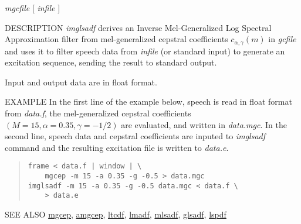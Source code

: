 \begin{synopsis}
\item [imglsadf] [ --m $M$ ] [ --a $A$ ] [ --g $G$ ] [ --p $P$ ]
		 [ --i $I$ ]  [ --t ]  [ --k ]
\item [\ ~~~~~~~~~] {\em mgcfile} [ {\em infile} ]
\end{synopsis}

\begin{qsection}{DESCRIPTION}
{\em imglsadf} derives an Inverse Mel-Generalized 
Log Spectral Approximation filter from 
mel-generalized cepstral coefficients $c_{\alpha,\gamma}(m)$ in {\em gcfile} 
and uses it to filter speech data from {\em infile} (or standard input) 
to generate an excitation sequence,
sending the result to standard output.

Input and output data are in float format.
\end{qsection}

\begin{options} 
\end{options}

\begin{qsection}{EXAMPLE}
In the first line of the example below, 
speech is read in float format from {\em data.f},
the mel-generalized cepstral coefficients $(M=15,\alpha=0.35,\gamma=-1/2)$
are evaluated, and written in {\em data.mgc}.
In the second line,
speech data and cepstral coefficients are
inputed to {\em imglsadf} command and the resulting excitation file
is written to {\em data.e}.
\begin{quote}
 \verb!frame < data.f | window | \!\\
 \verb!    mgcep -m 15 -a 0.35 -g -0.5 > data.mgc!\\
 \verb!imglsadf -m 15 -a 0.35 -g -0.5 data.mgc < data.f \!\\
 \verb!    > data.e!
\end{quote} 
\end{qsection}

\begin{qsection}{SEE ALSO}
\hyperlink{mgcep}{mgcep},
\hyperlink{amgcep}{amgcep},
\hyperlink{ltcdf}{ltcdf},
\hyperlink{lmadf}{lmadf},
\hyperlink{mlsadf}{mlsadf},
\hyperlink{glsadf}{glsadf},
\hyperlink{lspdf}{lspdf}
\end{qsection}
